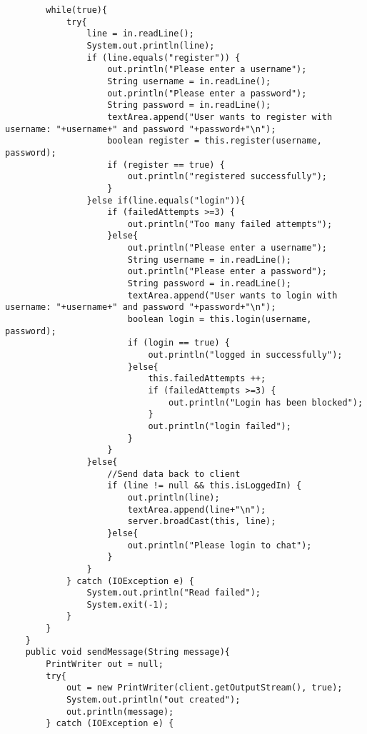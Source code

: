 \documentclass[10pt,a4paper]{article}
\begin{document}
\begin{verbatim}
        while(true){
            try{
                line = in.readLine();
                System.out.println(line);
                if (line.equals("register")) {
                    out.println("Please enter a username");
                    String username = in.readLine();
                    out.println("Please enter a password");
                    String password = in.readLine();
                    textArea.append("User wants to register with username: "+username+" and password "+password+"\n");
                    boolean register = this.register(username, password);
                    if (register == true) {
                        out.println("registered successfully");
                    }
                }else if(line.equals("login")){
                    if (failedAttempts >=3) {
                        out.println("Too many failed attempts");
                    }else{
                        out.println("Please enter a username");
                        String username = in.readLine();
                        out.println("Please enter a password");
                        String password = in.readLine();
                        textArea.append("User wants to login with username: "+username+" and password "+password+"\n");
                        boolean login = this.login(username, password);
                        if (login == true) {
                            out.println("logged in successfully");
                        }else{
                            this.failedAttempts ++;
                            if (failedAttempts >=3) {
                                out.println("Login has been blocked");
                            }
                            out.println("login failed");
                        }
                    }
                }else{
                    //Send data back to client
                    if (line != null && this.isLoggedIn) {
                        out.println(line);
                        textArea.append(line+"\n");
                        server.broadCast(this, line);
                    }else{
                        out.println("Please login to chat");
                    }
                }
            } catch (IOException e) {
                System.out.println("Read failed");
                System.exit(-1);
            }
        }
    }
    public void sendMessage(String message){
        PrintWriter out = null;
        try{
            out = new PrintWriter(client.getOutputStream(), true);
            System.out.println("out created");
            out.println(message);
        } catch (IOException e) {

\end{verbatim}
\end{document}
